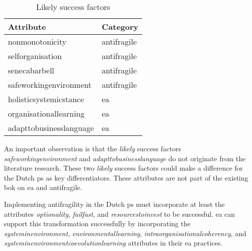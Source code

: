 \begin{table}[H]
	\centering
	\begin{tabular}{@{}ll@{}}
		\toprule
		\textbf{Attribute} & \textbf{Category} \\%
		\midrule
		\Gls{nonmonotonicity} & \Gls{antifragile}  \\%
		\Gls{selforganisation} & \Gls{antifragile}  \\%
		\Gls{senecabarbell} & \Gls{antifragile}  \\%
		\Gls{safeworkingenvironment} & \Gls{antifragile}  \\%
		\Gls{holisticsystemicstance} & \acrlong{ea}  \\%
		\Gls{organisationallearning} & \acrlong{ea}  \\%
		\Gls{adapttobusinesslanguage} & \acrlong{ea}  \\%
		\bottomrule
	\end{tabular}%
	\caption[Likely success factors]{Likely success factors}
	\label{tab:identifiedpossiblefactors}%
\end{table}%
An important observation is that the \textit{likely} success factors \textit{\gls{safeworkingenvironment}} and \textit{\gls{adapttobusinesslanguage}} do not originate from the literature research. These two \textit{likely} success factors could make a difference for the Dutch \gls{ps} as key differentiators. These \glspl{attribute} are not part of the existing \acrlong{bok} on \acrlong{ea} and \gls{antifragile}.

Implementing \gls{antifragility} in the Dutch \gls{ps} must incorporate at least the \glspl{attribute} \textit{\gls{optionality}}, \textit{\gls{failfast}}, and \textit{\gls{resourcestoinvest}} to be successful. \acrlong{ea} can support this transformation successfully by incorporating the \textit{\gls{systeminenvironment}}, \textit{\gls{environmentallearning}}, \textit{\gls{intraorganisationalcoherency}}, and \textit{\gls{systeminenvironmentcoevolutionlearning}} attributes in their \acrlong{ea} practices.

